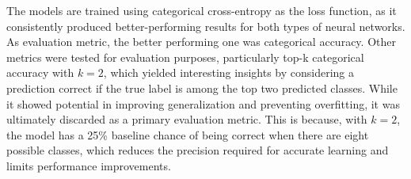 The models are trained using categorical cross-entropy as the loss function,
as it consistently produced better-performing results for both types of
neural networks.
As evaluation metric, the better performing one was categorical accuracy.
Other metrics were tested for evaluation purposes, particularly
top-k categorical accuracy with $k=2$, which yielded interesting insights
by considering a prediction correct if the true label is among the top two
predicted classes. While it showed potential in improving generalization and
preventing overfitting, it was ultimately discarded as a primary evaluation
metric. This is because, with $k=2$, the model has a 25\% baseline
chance of being correct when there are eight possible classes, which reduces
the precision required for accurate learning and limits performance improvements.